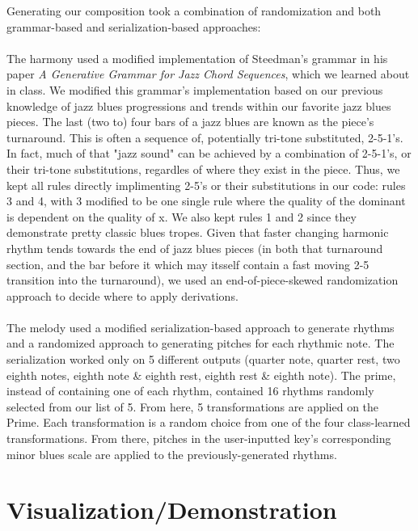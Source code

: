 \documentclass{article}
\begin{document}
Generating our composition took a combination of randomization and both grammar-based and serialization-based approaches:\\
\\
The harmony used a modified implementation of Steedman's grammar in his paper \textit{A Generative Grammar for Jazz Chord Sequences}, which we learned about in class. We modified this grammar's implementation based on our previous knowledge of jazz blues progressions and trends within our favorite jazz blues pieces. The last (two to) four bars of a jazz blues are known as the piece's turnaround. This is often a sequence of, potentially tri-tone substituted, 2-5-1's. In fact, much of that "jazz sound" can be achieved by a combination of 2-5-1's, or their tri-tone substitutions, regardles of where they exist in the piece. Thus, we kept all rules directly implimenting 2-5's or their substitutions in our code: rules 3 and 4, with 3 modified to be one single rule where the quality of the dominant is dependent on the quality of x. We also kept rules 1 and 2 since they demonstrate pretty classic blues tropes. Given that faster changing harmonic rhythm tends towards the end of jazz blues pieces (in both that turnaround section, and the bar before it which may itsself contain a fast moving 2-5 transition into the turnaround), we used an end-of-piece-skewed randomization approach to decide where to apply derivations.\\
\\
The melody used a modified serialization-based approach to generate rhythms and a randomized approach to generating pitches for each rhythmic note. The serialization worked only on 5 different outputs (quarter note, quarter rest, two eighth notes, eighth note \& eighth rest, eighth rest \& eighth note). The prime, instead of containing one of each rhythm, contained 16 rhythms randomly selected from our list of 5. From here, 5 transformations are applied on the Prime. Each transformation is a random choice from one of the four class-learned transformations. From there, pitches in the user-inputted key's corresponding minor blues scale are applied to the previously-generated rhythms.

\section{Visualization/Demonstration}

\begin {figure}[h]
\centering
\end{figure}
\end{document}
